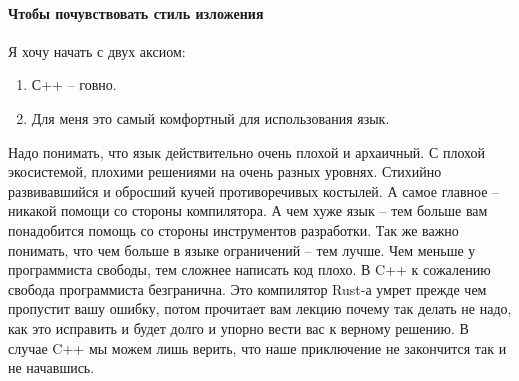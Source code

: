 \paragraph{Чтобы почувствовать стиль изложения}

Я хочу начать с двух аксиом:
\begin{enumerate}
\item С++ -- говно.

\item Для меня это самый комфортный для использования язык.
\end{enumerate}
Надо понимать, что язык действительно очень плохой и архаичный.
С плохой экосистемой, плохими решениями на очень разных уровнях.
Стихийно развивавшийся и обросший кучей противоречивых костылей.
А самое главное -- никакой помощи со стороны компилятора.
А чем хуже язык -- тем больше вам понадобится помощь со стороны инструментов разработки.
Так же важно понимать, что чем больше в языке ограничений -- тем лучше.
Чем меньше у программиста свободы, тем сложнее написать код плохо.
В C++ к сожалению свобода программиста безгранична.
Это компилятор Rust-а умрет прежде чем пропустит вашу ошибку, потом прочитает вам лекцию почему так делать не надо, как это исправить и будет долго и упорно вести вас к верному решению.
В случае C++ мы можем лишь верить, что наше приключение не закончится так и не начавшись.
